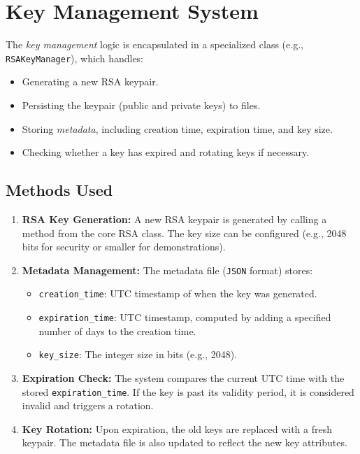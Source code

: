 \documentclass[12pt]{article}
\begin{document}
\section{Key Management System}
The \emph{key management} logic is encapsulated in a specialized class (e.g., \texttt{RSAKeyManager}), which handles:
\begin{itemize}
    \item Generating a new RSA keypair.
    \item Persisting the keypair (public and private keys) to files.
    \item Storing \emph{metadata}, including creation time, expiration time, and key size.
    \item Checking whether a key has expired and rotating keys if necessary.
\end{itemize}

\subsection{Methods Used}
\begin{enumerate}
    \item \textbf{RSA Key Generation:} 
    A new RSA keypair is generated by calling a method from the core RSA class. The key size can be configured (e.g., 2048 bits for security or smaller for demonstrations).
    
    \item \textbf{Metadata Management:}
    The metadata file (\texttt{JSON} format) stores:
    \begin{itemize}
        \item \texttt{creation\_time}: UTC timestamp of when the key was generated.
        \item \texttt{expiration\_time}: UTC timestamp, computed by adding a specified number of days to the creation time.
        \item \texttt{key\_size}: The integer size in bits (e.g., 2048).
    \end{itemize}

    \item \textbf{Expiration Check:}
    The system compares the current UTC time with the stored \texttt{expiration\_time}. If the key is past its validity period, it is considered invalid and triggers a rotation.

    \item \textbf{Key Rotation:}
    Upon expiration, the old keys are replaced with a fresh keypair. The metadata file is also updated to reflect the new key attributes.
\end{enumerate}
\end{document}
